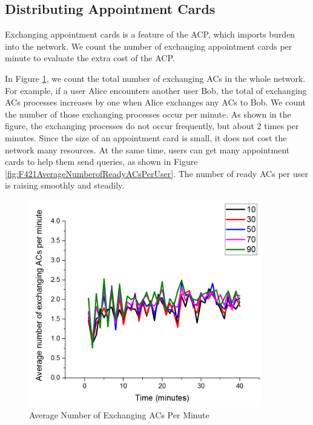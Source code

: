 
\subsection{ Distributing Appointment Cards}

\noindent Exchanging appointment cards is a feature of the ACP, which imports burden into the network. We count the number of exchanging appointment cards per minute to evaluate the extra cost of the ACP.

In Figure \ref{fig:F422AverageNumberofExchangingACsPerMinute}, we count the total number of exchanging ACs in the whole network. For example, if a user Alice encounters another user Bob, the total of exchanging ACs processes increases by one when Alice exchanges any ACs to Bob. We count the number of those exchanging processes occur per minute. As shown in the figure, the exchanging processes do not occur frequently, but about 2 times per minutes. Since the size of an appointment card is small, it does not cost the network many resources. At the same time, users can get many appointment cards to help them send queries, as shown in Figure \ref{fig:F421AverageNumberofReadyACsPerUser}. The number of ready ACs per user is raising smoothly and steadily. 

\begin{figure} [hbtp]
  \centering 
  \includegraphics[width=4.0in]{figures/F422AverageNumberofExchangingACsPerMinute.png}
  \caption{Average Number of Exchanging ACs Per Minute} 
  \label{fig:F422AverageNumberofExchangingACsPerMinute} %
\end{figure}


